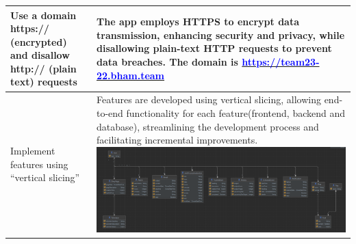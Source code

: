 \documentclass[a4paper]{article}
\begin{document}
{\begin{tabular}{|p{0.25\linewidth}|p{0.75\linewidth}|}
 \hline
 Use a domain https:// (encrypted) and disallow http:// (plain text) requests &  The app employs HTTPS to encrypt data transmission, enhancing security and privacy, while disallowing plain-text HTTP requests to prevent data breaches. The domain is \href{https://team23-22.bham.team}{\textcolor{blue}{https://team23-22.bham.team}}\\
 \hline
 Implement features using “vertical slicing” & Features are developed using vertical slicing, allowing end-to-end functionality for each feature(frontend, backend and database), streamlining the development process and facilitating incremental improvements. \includegraphics[width=12cm]{./image/Vertical_slice.png}\\
 \hline
\end{tabular}}
\end{document}
